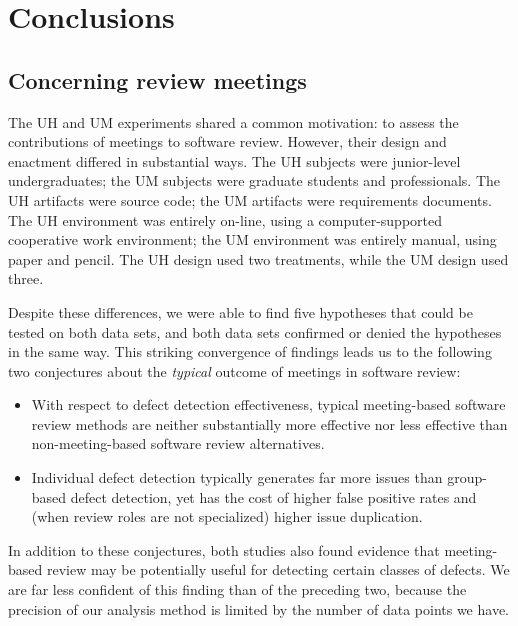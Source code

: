 \section{Conclusions}

\subsection{Concerning review meetings}

The UH and UM experiments shared a common motivation: to assess the 
contributions of meetings to software review. However, their design
and enactment differed in substantial ways. The UH subjects were
junior-level undergraduates; the UM subjects were graduate students
and professionals. The UH artifacts were source code; the UM artifacts
were requirements documents. The UH environment was entirely on-line,
using a computer-supported cooperative work environment; 
the UM environment was entirely manual, using paper and pencil. 
The UH design used two treatments, while the UM design used three. 

Despite these differences, we were able to find five 
hypotheses that could be tested on both data sets, and both data sets
confirmed or denied the hypotheses in the same way. This striking 
convergence of findings leads us to the following two conjectures about 
the {\em typical} outcome of meetings in software review:

\begin{itemize}
  
\item With respect to defect detection effectiveness, typical
  meeting-based software review methods are neither substantially more
  effective nor less effective than non-meeting-based software review
  alternatives.
      
\item Individual defect detection typically generates far more issues than
  group-based defect detection, yet has the cost of higher false positive
  rates and (when review roles are not specialized) higher issue
  duplication.
      
\end{itemize}

In addition to these conjectures, both studies also found evidence that
meeting-based review may be potentially useful for detecting certain
classes of defects.  We are far less confident of this finding than of the
preceding two, because the precision of our analysis method is limited
by the number of data points we have.

